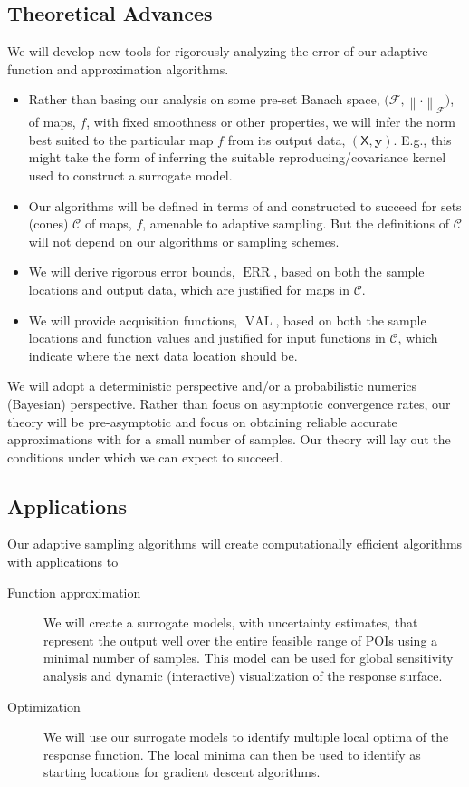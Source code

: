 \documentclass[11pt]{NSFamsart}
\DeclareMathOperator{\ERR}{ERR}
\DeclareMathOperator{\VAL}{VAL}
\newcommand{\mX}{\mathsf{X}}
\newcommand{\by}{{\boldsymbol{y}}}
\newcommand{\calc}{{\mathcal{C}}}
\newcommand{\calf}{{\mathcal{F}}}
\newcommand{\norm}[2][{}]{\ensuremath{\left \lVert #2 \right \rVert}_{#1}}
\begin{document}
\subsection{Theoretical Advances}
We will develop new tools for rigorously analyzing the error of our adaptive function and approximation algorithms.  
\begin{itemize}
\item Rather than basing our analysis on some pre-set Banach space, $\bigl(\calf,\norm[\calf]{\cdot}\bigr)$, of maps, $f$, with fixed smoothness or other properties, we will infer the norm best suited to the particular map $f$ from its output data, $(\mX,\by)$.  E.g., this might take the form of inferring the suitable reproducing/covariance kernel used to construct a surrogate model. 

\item Our algorithms will be defined in terms of and constructed to succeed for sets (cones) $\calc$ of maps, $f$, amenable to adaptive sampling. But the definitions of $\calc$ will not depend on our algorithms or sampling schemes.

\item We will derive rigorous error bounds, $\ERR$, based on both the sample locations and output data, which are justified for maps in $\calc$. 

\item We will provide  acquisition functions, $\VAL$, based on both the sample locations and function values and justified for input functions in $\calc$, which indicate where the next data location should be.
\end{itemize}
We will adopt a deterministic perspective and/or a probabilistic numerics (Bayesian) perspective.  Rather than focus on asymptotic convergence rates, our theory will be pre-asymptotic and focus on obtaining reliable accurate approximations with for a small number of samples.  Our theory will lay out the conditions under which we can expect to succeed.

\subsection{Applications}
Our adaptive sampling algorithms will create  computationally efficient algorithms with applications to 
\renewcommand{\descriptionlabel}[1]{\hspace{\labelsep}\textit{#1}.}
\begin{description}
\item[Function approximation] We will create a surrogate models, with uncertainty estimates, that represent the output well over the entire feasible range of POIs using a minimal number of samples.  This model can be used for global sensitivity analysis and dynamic (interactive) visualization of the response surface. 
\item[Optimization] We will use our surrogate models to identify multiple local optima of the response function.  The local minima can then be used to identify as starting locations for gradient descent algorithms.
\end{description}
\end{document}
